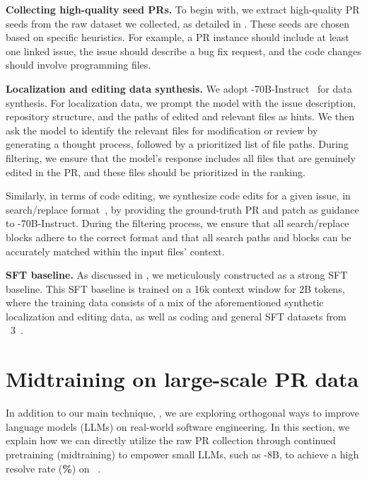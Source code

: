 \textbf{Collecting high-quality seed PRs.}
To begin with, we extract high-quality PR seeds from the raw dataset we collected, as detailed in .
These seeds are chosen based on specific heuristics. For example, a PR instance should include at least one linked issue, the issue should describe a bug fix request, and the code changes should involve programming files.

\textbf{Localization and editing data synthesis.}
We adopt -70B-Instruct~\cite{llama31} for data synthesis.
For localization data, we prompt the model with the issue description, repository structure, and the paths of edited and relevant files as hints. We then ask the model to identify the relevant files for modification or review by generating a thought process, followed by a prioritized list of file paths.
During filtering, we ensure that the model's response includes all files that are genuinely edited in the PR, and these files should be prioritized in the ranking.

Similarly, in terms of code editing, we synthesize code edits for a given issue, in search/replace format~\cite{agentless}, by providing the ground-truth PR and patch as guidance to -70B-Instruct.
During the filtering process, we ensure that all search/replace blocks adhere to the correct format and that all search paths and blocks can be accurately matched within the input files' context.

\textbf{SFT baseline.}
As discussed in , we meticulously constructed \oursft[70] as a strong SFT baseline.
This SFT baseline is trained on a 16k context window for 2B tokens,
where the training data consists of a mix of the aforementioned synthetic localization and editing data, as well as coding and general SFT datasets from \llama~3~\cite{llama31}. 

\section{Midtraining on large-scale PR data}
\label{sec:apd:largetrain}
In addition to our main technique, \tech,
we are exploring orthogonal ways to improve language models (LLMs) on real-world software engineering.
In this section, we explain how we can directly utilize the raw PR collection through continued pretraining (midtraining) to empower small LLMs, such as -8B, to achieve a high resolve rate (\textbf{\swebfinalsmall{}\%}) on \swebverified~\cite{swebverified}.

